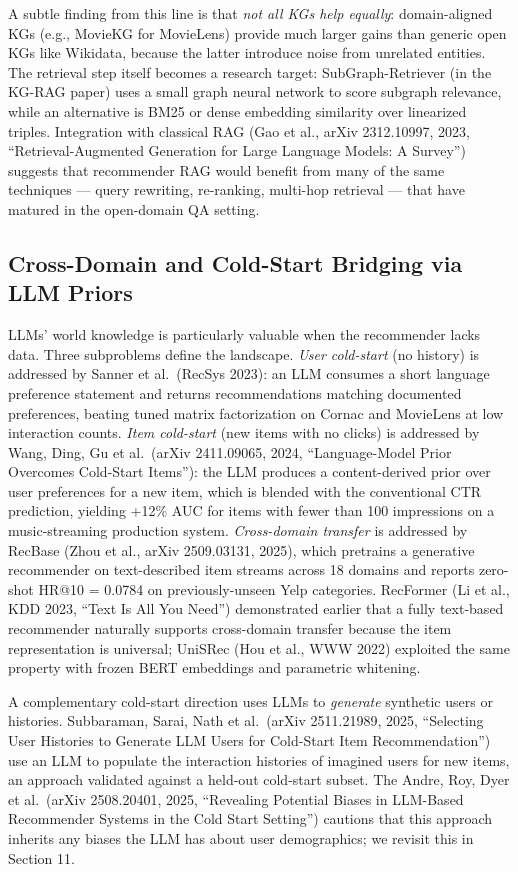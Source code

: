 A subtle finding from this line is that \emph{not all KGs help equally}: domain-aligned KGs (e.g., MovieKG for MovieLens) provide much larger gains than generic open KGs like Wikidata, because the latter introduce noise from unrelated entities. The retrieval step itself becomes a research target: SubGraph-Retriever (in the KG-RAG paper) uses a small graph neural network to score subgraph relevance, while an alternative is BM25 or dense embedding similarity over linearized triples. Integration with classical RAG (Gao et al., arXiv 2312.10997, 2023, ``Retrieval-Augmented Generation for Large Language Models: A Survey'') suggests that recommender RAG would benefit from many of the same techniques --- query rewriting, re-ranking, multi-hop retrieval --- that have matured in the open-domain QA setting.

\subsection{Cross-Domain and Cold-Start Bridging via LLM Priors}\label{cross-domain-and-cold-start-bridging-via-llm-priors}

LLMs' world knowledge is particularly valuable when the recommender lacks data. Three subproblems define the landscape. \emph{User cold-start} (no history) is addressed by Sanner et al.~(RecSys 2023): an LLM consumes a short language preference statement and returns recommendations matching documented preferences, beating tuned matrix factorization on Cornac and MovieLens at low interaction counts. \emph{Item cold-start} (new items with no clicks) is addressed by Wang, Ding, Gu et al.~(arXiv 2411.09065, 2024, ``Language-Model Prior Overcomes Cold-Start Items''): the LLM produces a content-derived prior over user preferences for a new item, which is blended with the conventional CTR prediction, yielding +12\% AUC for items with fewer than 100 impressions on a music-streaming production system. \emph{Cross-domain transfer} is addressed by RecBase (Zhou et al., arXiv 2509.03131, 2025), which pretrains a generative recommender on text-described item streams across 18 domains and reports zero-shot HR@10 = 0.0784 on previously-unseen Yelp categories. RecFormer (Li et al., KDD 2023, ``Text Is All You Need'') demonstrated earlier that a fully text-based recommender naturally supports cross-domain transfer because the item representation is universal; UniSRec (Hou et al., WWW 2022) exploited the same property with frozen BERT embeddings and parametric whitening.

A complementary cold-start direction uses LLMs to \emph{generate} synthetic users or histories. Subbaraman, Sarai, Nath et al.~(arXiv 2511.21989, 2025, ``Selecting User Histories to Generate LLM Users for Cold-Start Item Recommendation'') use an LLM to populate the interaction histories of imagined users for new items, an approach validated against a held-out cold-start subset. The Andre, Roy, Dyer et al.~(arXiv 2508.20401, 2025, ``Revealing Potential Biases in LLM-Based Recommender Systems in the Cold Start Setting'') cautions that this approach inherits any biases the LLM has about user demographics; we revisit this in Section 11.

